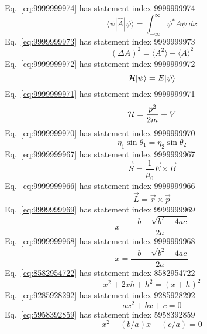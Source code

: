 \documentclass[12pt]{report}
\newcommand{\bra}[1]{\langle #1 |}
\newcommand{\ket}[1]{| #1\rangle}
\begin{document}
Eq.~\ref{eq:9999999974} has statement index 9999999974
\begin{equation}
\bra{\psi} \hat{A} \ket{\psi} = \int_{-\infty}^{\infty} \psi^* A \psi\ dx
\label{eq:9999999974}
\end{equation}
Eq.~\ref{eq:9999999973} has statement index 9999999973
\begin{equation}
\left( \Delta A \right)^2  = \langle A^2 \rangle - \langle A \rangle^2
\label{eq:9999999973}
\end{equation}
Eq.~\ref{eq:9999999972} has statement index 9999999972
\begin{equation}
{\cal H} \ket{\psi} = E \ket{\psi}
\label{eq:9999999972}
\end{equation}
Eq.~\ref{eq:9999999971} has statement index 9999999971
\begin{equation}
{\cal H} = \frac{p^2}{2m}+V
\label{eq:9999999971}
\end{equation}
Eq.~\ref{eq:9999999970} has statement index 9999999970
\begin{equation}
\eta_1 \sin\theta_1 = \eta_2 \sin\theta_2
\label{eq:9999999970}
\end{equation}
Eq.~\ref{eq:9999999967} has statement index 9999999967
\begin{equation}
\vec{S} = \frac{1}{\mu_0} \vec{E}\times \vec{B}
\label{eq:9999999967}
\end{equation}
Eq.~\ref{eq:9999999966} has statement index 9999999966
\begin{equation}
\vec{L} = \vec{r}\times\vec{p}
\label{eq:9999999966}
\end{equation}
Eq.~\ref{eq:9999999969} has statement index 9999999969
\begin{equation}
x=\frac{-b+\sqrt{b^2-4ac}}{2a}
\label{eq:9999999969}
\end{equation}
Eq.~\ref{eq:9999999968} has statement index 9999999968
\begin{equation}
x=\frac{-b-\sqrt{b^2-4ac}}{2a}
\label{eq:9999999968}
\end{equation}
Eq.~\ref{eq:8582954722} has statement index 8582954722
\begin{equation}
x^2 + 2xh + h^2 = (x+h)^2
\label{eq:8582954722}
\end{equation}
Eq.~\ref{eq:9285928292} has statement index 9285928292
\begin{equation}
ax^2 + bx + c = 0
\label{eq:9285928292}
\end{equation}
Eq.~\ref{eq:5958392859} has statement index 5958392859
\begin{equation}
x^2 + (b/a)x+(c/a) =0
\label{eq:5958392859}
\end{equation}
\end{document}
